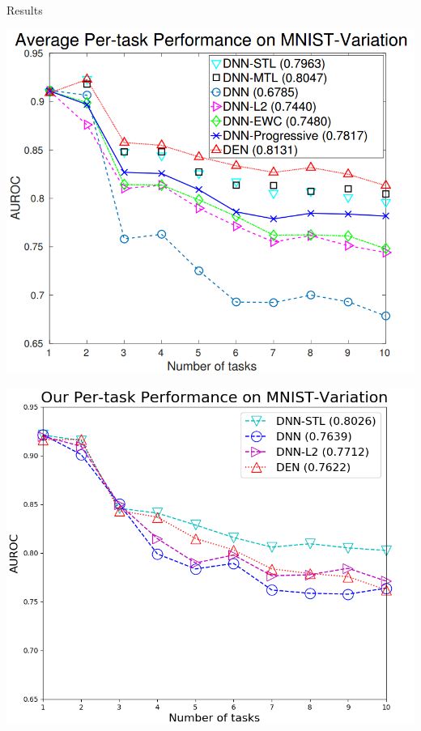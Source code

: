 \documentclass[a0paper,portrait]{baposter}
\begin{document}
\begin{poster}
\begin{posterbox}[name=results,column=0,span=2,above=bottom]{Results}
\begin{center}
\begin{minipage}{.49\textwidth}
    \includegraphics[width=\textwidth]{acc_them_den}
\end{minipage}
\hfill
\begin{minipage}{.49\textwidth}
    \includegraphics[width=\textwidth]{acc_us_den}
\end{minipage}
\end{center}
\end{posterbox}


\end{poster}
\end{document}
